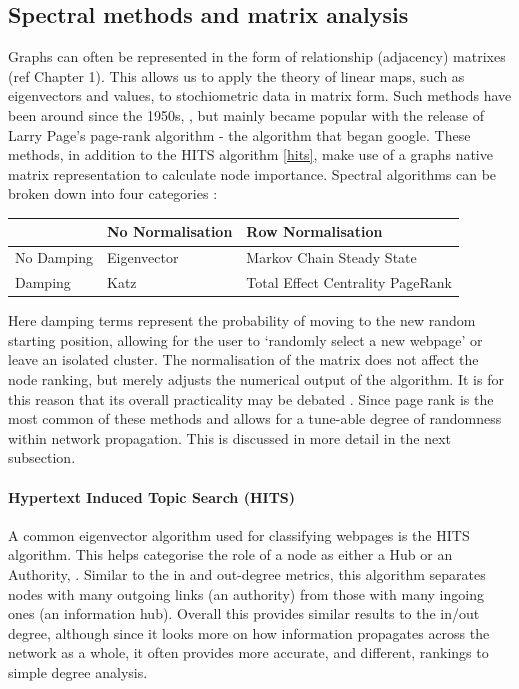 % 
% 
% 
\subsection{Spectral methods and matrix analysis}

Graphs can often be represented in the form of relationship (adjacency) matrixes (ref Chapter 1). This allows us to apply the theory of linear maps, such as eigenvectors and values, to stochiometric data in matrix form. Such methods have been around since the 1950s, \citep{seeley}, but mainly became popular with the release of Larry Page's page-rank algorithm \citep{google} - the algorithm that began google. These methods, in addition to the HITS algorithm \autoref{hits}, make use of a graphs native matrix representation to calculate node importance. Spectral algorithms can be broken down into four categories \citep{spectral}:

\begin{table}[H]
  \centering
\begin{tabular}{p{}||p{} p{}}
\hline
 & No Normalisation  & Row Normalisation \\
 \hline \hline
No Damping & Eigenvector \citep{eigen, eigen2}  \: & Markov Chain Steady State \citep{seeley} \: \\
Damping & Katz \citep{katz} \: & Total Effect Centrality PageRank \citep{google} \\ \hline
\end{tabular}
\end{table}


Here damping terms represent the probability of moving to the new random starting position, allowing for the user to `randomly select a new webpage' or leave an isolated cluster. The normalisation of the matrix does not affect the node ranking, but merely adjusts the numerical output of the algorithm. It is for this reason that its overall practicality may be debated \citep{spectral}. Since page rank is the most common of these methods and allows for a tune-able degree of randomness within network propagation. This is discussed in more detail in the next subsection.


    
    \paragraph*{Hypertext Induced Topic Search (HITS)}\label{hits}
    A common eigenvector algorithm used for classifying webpages is the 
    HITS algorithm. This helps categorise the role of a node as either a Hub or an Authority,
     \citep{hits,hitsvspagerank,hitsweb}. Similar to the in and out-degree metrics, this algorithm separates nodes with many outgoing links (an authority) from those with many ingoing ones (an information hub). Overall this provides similar results to the in/out degree, although since it looks more on how information propagates across the network as a whole, it often provides more accurate, and different, rankings to simple degree analysis.  
     
